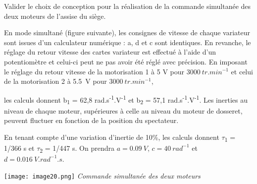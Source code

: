 \begin{multicols}{2}

\begin{obj}

Valider le choix de conception pour la réalisation de la commande simultanée des deux moteurs de l'assise du siège.
\end{obj}

\ifprof
\else

En mode simultané (figure suivante), les consignes de vitesse de chaque
variateur sont issues d'un calculateur numérique : a, d et c sont
identiques. En revanche, le réglage du retour vitesse des cartes
variateur est effectué à l'aide d'un potentiomètre et celui-ci peut ne
pas avoir été réglé avec précision. En imposant le réglage du retour
vitesse de la motorisation 1 à 5 V pour $\SI{3000}{tr.min^{-1}}$
et celui de la motorisation 2 à \SI{5,5}{V} pour $\SI{3000}{tr. min^{-1}}$,

les calculs donnent b\textsubscript{1} = 62,8
rad.s\textsuperscript{-1}.V\textsuperscript{-1} et b\textsubscript{2} =
57,1 rad.s\textsuperscript{-1}.V\textsuperscript{-1}. Les inerties au
niveau de chaque moteur, supérieures à celle au niveau du moteur de
dosseret, peuvent fluctuer en fonction de la position du spectateur.

En tenant compte d'une variation d'inertie de 10\%, les calculs donnent
$\tau$\textsubscript{1} = 1/366 s et $\tau$\textsubscript{2} = 1/447 s. On prendra
$a =\SI{0,09}{V}$, $c =\SI{40}{rad^{-1}}$ et $d = \SI{0,016}{V.rad^{-1}.s}$.


\begin{center}
\texttt{[image: image20.png]}
\textit{Commande simultanée des deux moteurs \label{fig19}}
\end{center}

\fi


\end{multicols}
